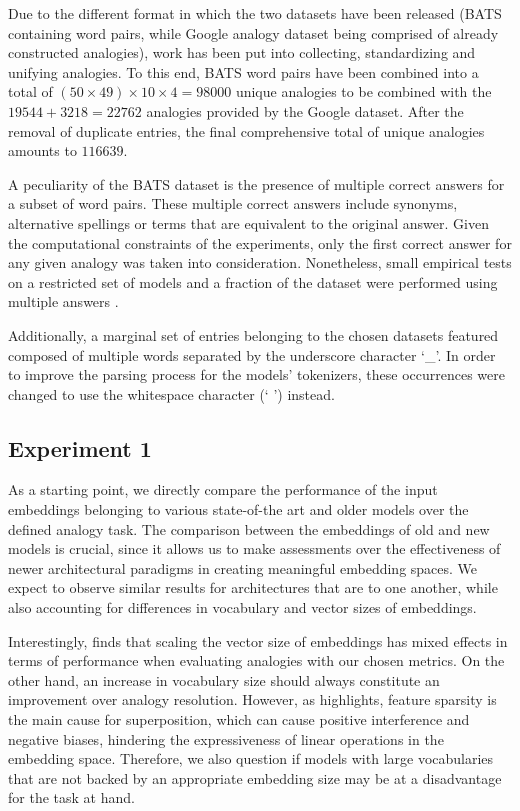 Due to the different format in which the two datasets have been released (BATS containing word pairs, while Google analogy dataset being comprised of already constructed analogies),  work has been put into collecting, standardizing and unifying analogies.
To this end, BATS word pairs have been combined into a total of $(50 \times 49) \times 10 \times 4 = 98000$ unique analogies to be combined with the $19544 + 3218 = 22762$ analogies provided by the Google dataset.
After the removal of duplicate entries, the final comprehensive total of unique analogies amounts to $116639$.

A peculiarity of the BATS dataset is the presence of multiple correct answers for a subset of word pairs.
These multiple correct answers include synonyms, alternative spellings or terms that are equivalent to the original answer.
Given the computational constraints of the experiments, only the first correct answer for any given analogy was taken into consideration.
Nonetheless, small empirical tests on a restricted set of models and a fraction of the dataset were performed using multiple answers .

Additionally, a marginal set of entries belonging to the chosen datasets featured  composed of multiple words separated by the underscore character `\_'.
In order to improve the parsing process for the models' tokenizers, these occurrences were changed to use the whitespace character (` ') instead.

\subsection{Experiment 1}\label{ssec:exp_emb_exp1}

As a starting point, we directly compare the performance of the input embeddings belonging to various state-of-the art and older models over the defined analogy task.
The comparison between the embeddings of old and new models is crucial, since it allows us to make assessments over the effectiveness of newer architectural paradigms in creating meaningful embedding spaces.
We expect to observe similar results for architectures that are  to one another, while also accounting for differences in vocabulary and vector sizes of embeddings.

Interestingly, \citet{drozd2016} finds that scaling the vector size of embeddings has mixed effects in terms of performance when evaluating analogies with our chosen metrics.
On the other hand, an increase in vocabulary size should always constitute an improvement over analogy resolution.
However, as \citet{elhage2022} highlights, feature sparsity is the main cause for superposition, which can cause positive interference and negative biases, hindering the expressiveness of linear operations in the embedding space.
Therefore, we also question if models with large vocabularies that are not backed by an appropriate embedding size may be at a disadvantage for the task at hand.

